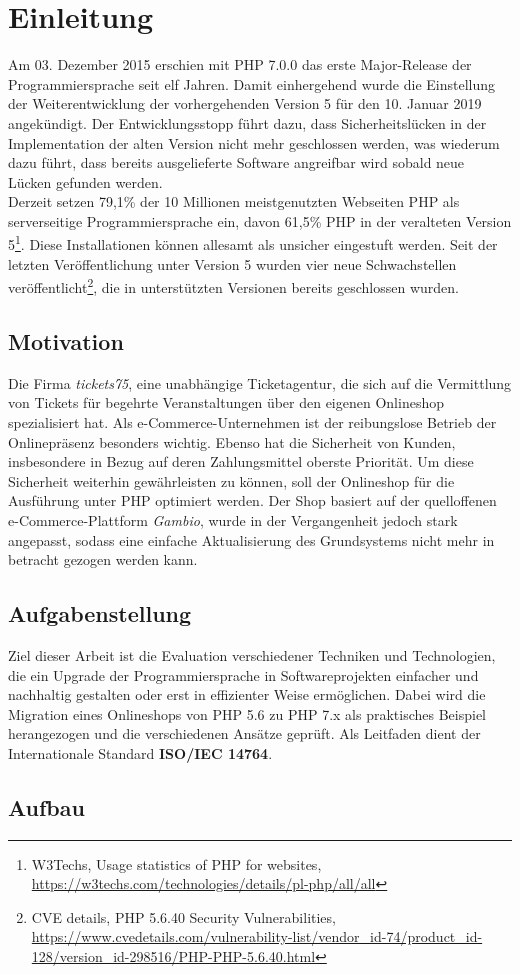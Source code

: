 \chapter{Einleitung}
Am 03. Dezember 2015 erschien mit PHP 7.0.0 das erste Major-Release der Programmiersprache seit elf Jahren. Damit einhergehend wurde die Einstellung der Weiterentwicklung der vorhergehenden Version
5 für den 10. Januar 2019 angekündigt. Der Entwicklungsstopp führt dazu, dass Sicherheitslücken in der Implementation der alten Version nicht mehr geschlossen werden, was 
wiederum dazu führt, dass bereits ausgelieferte Software angreifbar wird sobald neue Lücken gefunden werden. \\
Derzeit setzen 79,1\% der 10 Millionen meistgenutzten Webseiten PHP als serverseitige Programmiersprache ein, davon 61,5\% PHP in der veralteten Version 5\footnote{W3Techs, \glqq Usage statistics of PHP for websites\grqq , 
\url{https://w3techs.com/technologies/details/pl-php/all/all}}. Diese Installationen können allesamt als unsicher eingestuft werden. Seit der letzten Veröffentlichung 
unter Version 5 wurden vier neue Schwachstellen veröffentlicht\footnote{CVE details, \glqq PHP 5.6.40 Security Vulnerabilities\grqq , 
\url{https://www.cvedetails.com/vulnerability-list/vendor_id-74/product_id-128/version_id-298516/PHP-PHP-5.6.40.html}}, die in unterstützten Versionen bereits geschlossen 
wurden.

\section{Motivation}
Die Firma \textit{tickets75}, eine unabhängige Ticketagentur, die sich auf die Vermittlung von Tickets für begehrte 
Veranstaltungen über den eigenen Onlineshop spezialisiert hat. Als e-Commerce-Unternehmen ist der reibungslose Betrieb der 
Onlinepräsenz besonders wichtig. Ebenso hat die Sicherheit von Kunden, insbesondere in Bezug auf deren Zahlungsmittel oberste 
Priorität. Um diese Sicherheit weiterhin gewährleisten zu können, soll der Onlineshop für die Ausführung unter \ac{PHP} optimiert 
werden. Der Shop basiert auf der quelloffenen e-Commerce-Plattform \textit{Gambio}, wurde in der Vergangenheit jedoch stark 
angepasst, sodass eine einfache Aktualisierung des Grundsystems nicht mehr in betracht gezogen werden kann.

\section{Aufgabenstellung}
Ziel dieser Arbeit ist die Evaluation verschiedener Techniken und Technologien, die ein Upgrade der Programmiersprache in Softwareprojekten einfacher und nachhaltig gestalten 
oder erst in effizienter Weise ermöglichen. Dabei wird die Migration eines Onlineshops von PHP 5.6 zu PHP 7.x als praktisches Beispiel herangezogen und die verschiedenen 
Ansätze geprüft. Als Leitfaden dient der Internationale Standard \textbf{ISO/IEC 14764}.

\section{Aufbau}
